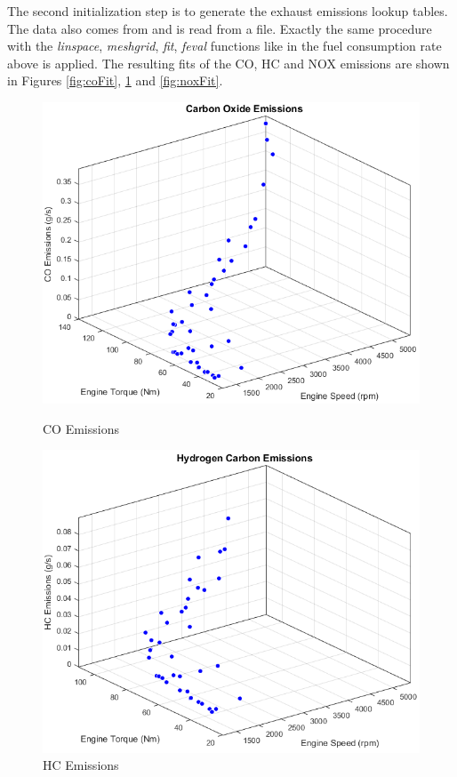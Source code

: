The second initialization step is to generate the exhaust emissions lookup tables. The data also comes from \citet{argonne1999} and is read from a file. Exactly the same procedure with the \textit{linspace}, \textit{meshgrid}, \textit{fit}, \textit{feval} functions like in the fuel consumption rate above is applied. The resulting fits of the CO, HC and NOX emissions are shown in Figures \ref{fig:coFit}, \ref{fig:hcFit} and \ref{fig:noxFit}.

\begin{figure}[h]
\centering
\begin{minipage}{.5\textwidth}
  \centering
  \includegraphics[scale=0.42]{figures/CO}  
  \caption{CO Emissions}
  \label{fig:coFit}
\end{minipage}%
\begin{minipage}{.5\textwidth}
  	\centering
  \includegraphics[scale=0.42]{figures/HC}  
  \caption{HC Emissions}
  \label{fig:hcFit}
\end{minipage}
\end{figure}

